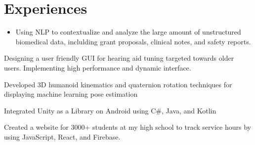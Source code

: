 \documentclass[]{main}
\begin{document}
\begin{minipage}[t]{0.66\textwidth} 

\section{Experiences}

\begin{itemize}
\item Using NLP to contextualize and analyze the large amount of unstructured biomedical data, inclulding grant proposals, clinical notes, and safety reports.
\end{itemize}


\begin{tightemize}
\item Designing a user friendly GUI for hearing aid tuning targeted towards older users. Implementing high performance and dynamic interface.
\end{tightemize}

\sectionsep

\begin{tightemize}
\item Developed 3D humanoid kinematics and quaternion rotation techniques
for displaying machine learning pose estimation
\item Integrated Unity as a Library on Android using C\#, Java, and Kotlin
\end{tightemize}
\sectionsep

\begin{tightemize}
\item Created a website for 3000+ students at my high school to track service hours by using JavaScript, React, and Firebase.
\end{tightemize}
\sectionsep




\end{minipage}
\end{document}
